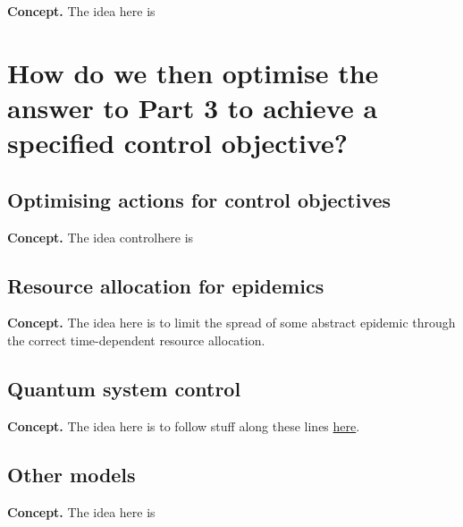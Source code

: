 \documentclass{book}
\begin{document}
{\bfseries\sffamily Concept.} The idea here is 


\part*{{ How do we then optimise the answer to Part 3 to achieve a specified control objective?}}


\chapter{\sffamily Optimising actions for control objectives}

{\bfseries\sffamily Concept.} The idea  controlhere is 


\chapter{\sffamily Resource allocation for epidemics}

{\bfseries\sffamily Concept.} The idea here is to limit the spread of some abstract epidemic through the correct time-dependent resource allocation.


\chapter{\sffamily Quantum system control}

{\bfseries\sffamily Concept.} The idea here is to follow stuff along these lines \href{https://arxiv.org/pdf/1210.7127.pdf}{here}.


\chapter{\sffamily Other models}

{\bfseries\sffamily Concept.} The idea here is




\backmatter


\end{document}
